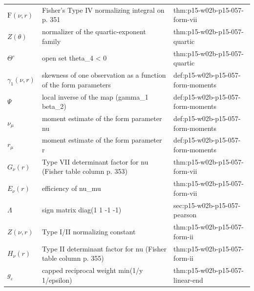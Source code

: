 \begin{longtable}{@{}p{}p{}p{}@{}}
\(\mathrm F(\nu,\allowbreak r)\) & Fisher's Type IV normalizing integral on p. 351 & thm:\allowbreak{}p15-\allowbreak{}w02b-\allowbreak{}p15-\allowbreak{}057-\allowbreak{}form-\allowbreak{}vii \\
\(Z(\theta)\) & normalizer of the quartic-exponent family & thm:\allowbreak{}p15-\allowbreak{}w02b-\allowbreak{}p15-\allowbreak{}057-\allowbreak{}quartic \\
\(\Theta^\circ\) & open set theta\_4 < 0 & thm:\allowbreak{}p15-\allowbreak{}w02b-\allowbreak{}p15-\allowbreak{}057-\allowbreak{}quartic \\
\(\gamma_1(\nu,\allowbreak r)\) & skewness of one observation as a function of the form parameters & def:\allowbreak{}p15-\allowbreak{}w02b-\allowbreak{}p15-\allowbreak{}057-\allowbreak{}form-\allowbreak{}moments \\
\(\Psi\) & local inverse of the map (gamma\_1 beta\_2) & def:\allowbreak{}p15-\allowbreak{}w02b-\allowbreak{}p15-\allowbreak{}057-\allowbreak{}form-\allowbreak{}moments \\
\(\nu_\mu\) & moment estimate of the form parameter nu & def:\allowbreak{}p15-\allowbreak{}w02b-\allowbreak{}p15-\allowbreak{}057-\allowbreak{}form-\allowbreak{}moments \\
\(r_\mu\) & moment estimate of the form parameter r & def:\allowbreak{}p15-\allowbreak{}w02b-\allowbreak{}p15-\allowbreak{}057-\allowbreak{}form-\allowbreak{}moments \\
\(G_\nu(r)\) & Type VII determinant factor for nu (Fisher table column p. 353) & thm:\allowbreak{}p15-\allowbreak{}w02b-\allowbreak{}p15-\allowbreak{}057-\allowbreak{}form-\allowbreak{}vii \\
\(E_\nu(r)\) & efficiency of nu\_mu & thm:\allowbreak{}p15-\allowbreak{}w02b-\allowbreak{}p15-\allowbreak{}057-\allowbreak{}form-\allowbreak{}vii \\
\(\Lambda\) & sign matrix diag(1 1 -1 -1) & sec:\allowbreak{}p15-\allowbreak{}w02b-\allowbreak{}p15-\allowbreak{}057-\allowbreak{}pearson \\
\(Z(\nu,\allowbreak r)\) & Type I/II normalizing constant & thm:\allowbreak{}p15-\allowbreak{}w02b-\allowbreak{}p15-\allowbreak{}057-\allowbreak{}form-\allowbreak{}ii \\
\(H_\nu(r)\) & Type II determinant factor for nu (Fisher table column p. 355) & thm:\allowbreak{}p15-\allowbreak{}w02b-\allowbreak{}p15-\allowbreak{}057-\allowbreak{}form-\allowbreak{}ii \\
\(g_\varepsilon\) & capped reciprocal weight min(1/y 1/epsilon) & thm:\allowbreak{}p15-\allowbreak{}w02b-\allowbreak{}p15-\allowbreak{}057-\allowbreak{}linear-\allowbreak{}end \\

\end{longtable}
